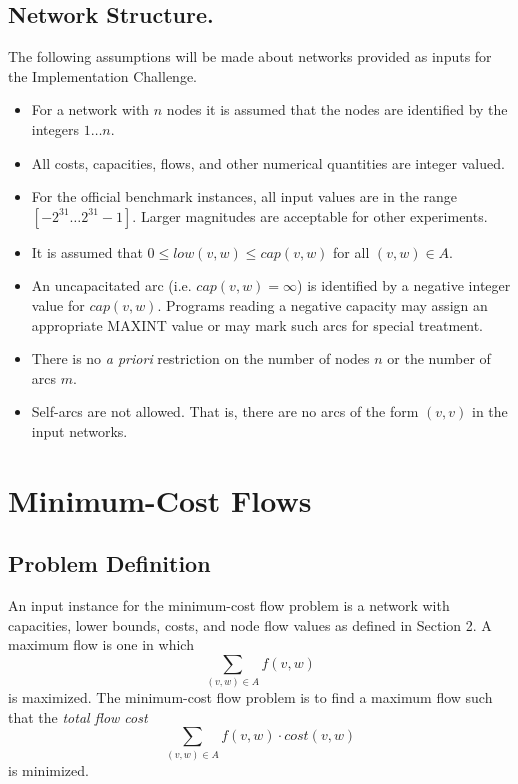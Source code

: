 \subsection{Network Structure.} 
The following assumptions will be made about networks provided as
inputs for the Implementation Challenge.  
\begin{itemize}

\item For a network with $n$ nodes it is assumed that the 
nodes are identified by the integers $1 \ldots n$.

\item All costs, capacities, flows, and other numerical quantities 
are integer valued.

\item For the official benchmark instances, all 
input values are in the range 
$[-2^{31} \ldots 2^{31} -1]$.  Larger
magnitudes are acceptable for other experiments.  

\item It is assumed that $0 \leq low(v,w) \leq cap(v,w)$ for all 
$(v,w) \in A$.  

\item  An uncapacitated arc (i.e. $cap(v,w) = \infty$) 
is identified by a negative integer value for 
$cap(v,w)$.  Programs reading a negative capacity
may assign an appropriate MAXINT value or may mark such 
arcs for special treatment. 

\item There is no {\em a priori} restriction on the number of 
nodes $n$ or the number of arcs $m$.   

\item Self-arcs are not allowed.  That is, there are no arcs of the 
form $(v,v)$ in the input networks. 

\end{itemize} 


\section{Minimum-Cost Flows} 

\subsection{Problem Definition} 
An input instance for the minimum-cost flow problem is a network with
capacities, lower bounds, costs, and node flow values as defined in
Section 2. A maximum flow is one in which
\[
\sum_{(v,w) \in A} f(v,w) 
\]
is maximized.  The minimum-cost flow problem is to find a maximum
flow such that the {\em total flow cost}
\[
\sum_{(v,w) \in A} f(v,w)\cdot cost(v,w)
\]
is minimized.

